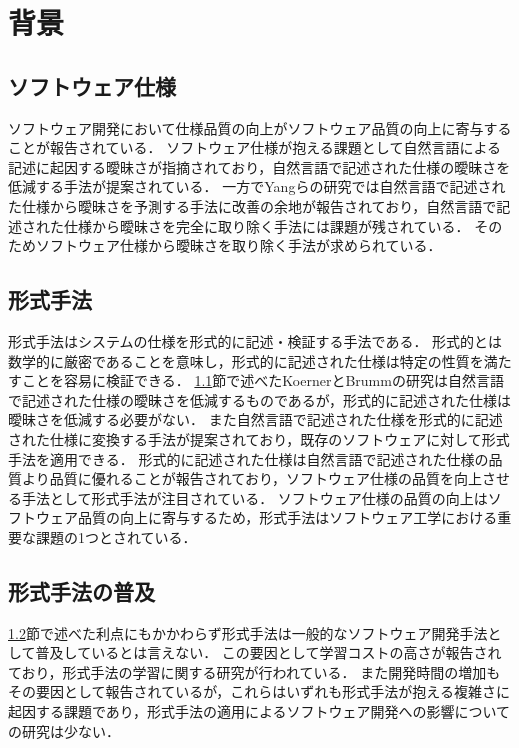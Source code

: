\documentclass[main]{subfiles}
\begin{document}
\chapter{背景}

\section{ソフトウェア仕様}
\label{sec:specification}

ソフトウェア開発において仕様品質の向上がソフトウェア品質の向上に寄与することが報告されている\cite{knauss:2009}．
ソフトウェア仕様が抱える課題として自然言語による記述に起因する曖昧さが指摘されており\cite{kamsties:2005}，自然言語で記述された仕様の曖昧さを低減する手法が提案されている\cite{korner:2009,yang:2011}．
一方でYangらの研究では自然言語で記述された仕様から曖昧さを予測する手法に改善の余地が報告されており，自然言語で記述された仕様から曖昧さを完全に取り除く手法には課題が残されている．
そのためソフトウェア仕様から曖昧さを取り除く手法が求められている．

\section{形式手法}
\label{sec:formal-method}

形式手法はシステムの仕様を形式的に記述・検証する手法である．
形式的とは数学的に厳密であることを意味し，形式的に記述された仕様は特定の性質を満たすことを容易に検証できる．
\ref{sec:specification}節で述べたKoernerとBrummの研究は自然言語で記述された仕様の曖昧さを低減するものであるが，形式的に記述された仕様は曖昧さを低減する必要がない．
また自然言語で記述された仕様を形式的に記述された仕様に変換する手法が提案されており\cite{ilieva:2005}，既存のソフトウェアに対して形式手法を適用できる．
形式的に記述された仕様は自然言語で記述された仕様の品質より品質に優れることが報告されており\cite{fabbrini:2001}，ソフトウェア仕様の品質を向上させる手法として形式手法が注目されている．%
ソフトウェア仕様の品質の向上はソフトウェア品質の向上に寄与するため，形式手法はソフトウェア工学における重要な課題の1つとされている．

\section{形式手法の普及}

\ref{sec:formal-method}節で述べた利点にもかかわらず形式手法は一般的なソフトウェア開発手法として普及しているとは言えない．
この要因として学習コストの高さが報告されており\cite{kurita:2011}，形式手法の学習に関する研究が行われている\cite{ohnishi:2020,araki:2010,araki:2011}．
また開発時間の増加もその要因として報告されている\cite{kitamura:2021}が，これらはいずれも形式手法が抱える複雑さに起因する課題であり，形式手法の適用によるソフトウェア開発への影響についての研究は少ない．
\end{document}
